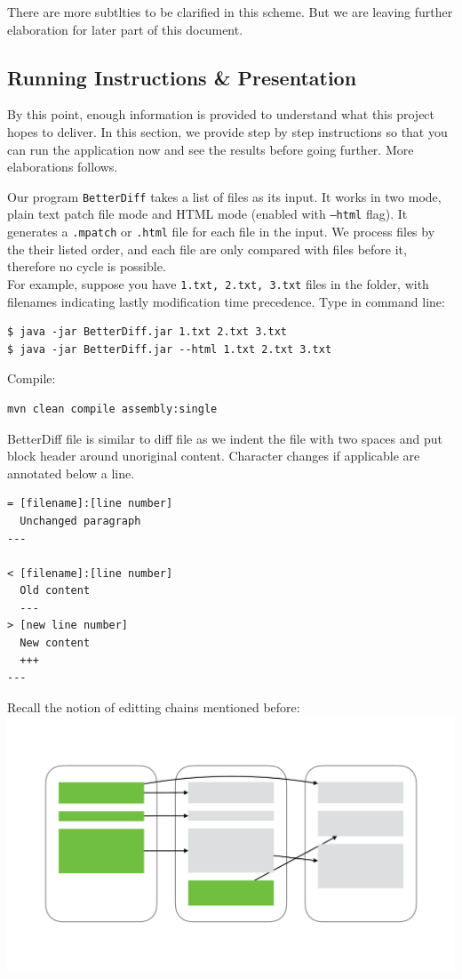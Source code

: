 \documentclass{article}
\begin{document}
There are more subtlties to be clarified in this scheme. But we are leaving further elaboration for later part of this document. 

\subsection{Running Instructions \& Presentation}
By this point, enough information is provided to understand what this project hopes to deliver. In this section, we provide step by step instructions so that you can run the application now and see the results before going further. More elaborations follows.

Our program \texttt{BetterDiff} takes a list of files as its input. It works in two mode, plain text patch file mode and HTML mode (enabled with \texttt{--html} flag). It generates a \texttt{.mpatch} or \texttt{.html} file for each file in the input. We process files by the their listed order, and each file are only compared with files before it, therefore no cycle is possible.\\

For example, suppose you have \texttt{1.txt, 2.txt, 3.txt} files in the folder, with filenames indicating lastly modification time precedence. Type in command line:
\begin{lstlisting}
$ java -jar BetterDiff.jar 1.txt 2.txt 3.txt
$ java -jar BetterDiff.jar --html 1.txt 2.txt 3.txt
\end{lstlisting}
Compile:
\begin{lstlisting}
mvn clean compile assembly:single
\end{lstlisting}
BetterDiff file is similar to diff file as we indent the file with two spaces and put block header around unoriginal content. Character changes if applicable are annotated below a line.
\begin{lstlisting}
= [filename]:[line number]
  Unchanged paragraph
---

< [filename]:[line number]
  Old content
  ---
> [new line number]
  New content
  +++
---
\end{lstlisting}
Recall the notion of editting chains mentioned before:\\
\includegraphics[scale=0.5,center]{1.pdf}\\
\end{document}

